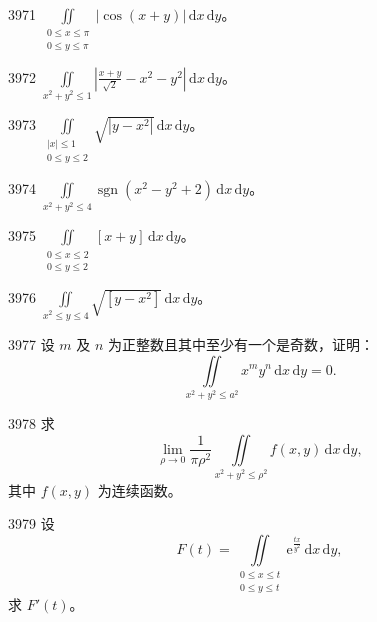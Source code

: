 \begin{prob}[S]{3971}
$\displaystyle \iint\limits_{\substack{0 \leqslant x \leqslant \pi \\ 0 \leqslant y \leqslant \pi}} |\cos(x + y)| \,\mathrm{d}x\,\mathrm{d}y$。
\end{prob}

\begin{prob}[S]{3972}
$\displaystyle \iint\limits_{x^2 + y^2 \leqslant 1} \left| \frac{x + y}{\sqrt{2}} - x^2 - y^2 \right| \,\mathrm{d}x\,\mathrm{d}y$。
\end{prob}

\begin{prob}[S]{3973}
$\displaystyle \iint\limits_{\substack{|x| \leqslant 1 \\ 0 \leqslant y \leqslant 2}} \sqrt{|y - x^2|} \,\mathrm{d}x\,\mathrm{d}y$。
\end{prob}


\begin{prob}[S]{3974}
$\displaystyle \iint\limits_{x^2 + y^2 \leqslant 4} \operatorname{sgn}(x^2 - y^2 + 2) \,\mathrm{d}x\,\mathrm{d}y$。
\end{prob}

\begin{prob}[S]{3975}
$\displaystyle \iint\limits_{\substack{0 \leqslant x \leqslant 2 \\ 0 \leqslant y \leqslant 2}} [x + y] \,\mathrm{d}x\,\mathrm{d}y$。
\end{prob}

\begin{prob}[S]{3976}
$\displaystyle \iint\limits_{x^2 \leqslant y \leqslant 4} \sqrt{[y - x^2]} \,\mathrm{d}x\,\mathrm{d}y$。
\end{prob}

\begin{prob}[M]{3977}
设 $m$ 及 $n$ 为正整数且其中至少有一个是奇数，证明：
\[
\iint\limits_{x^2 + y^2 \leqslant a^2} x^m y^n \,\mathrm{d}x\,\mathrm{d}y = 0.
\]
\end{prob}

\begin{prob}[M]{3978}
求
\[
\lim_{\rho \to 0} \frac{1}{\pi\rho^2} \iint\limits_{x^2 + y^2 \leqslant \rho^2} f(x, y) \,\mathrm{d}x\,\mathrm{d}y,
\]
其中 $f(x, y)$ 为连续函数。
\end{prob}

\begin{prob}[S]{3979}
设
\[
F(t) = \iint\limits_{\substack{0 \leqslant x \leqslant t \\ 0 \leqslant y \leqslant t}} \mathrm{e}^{\frac{tx}{y^2}} \,\mathrm{d}x\,\mathrm{d}y,
\]
求 $F'(t)$。
\end{prob}

